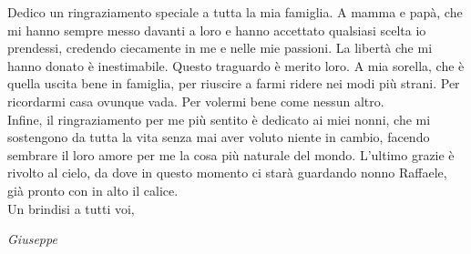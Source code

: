 Dedico un ringraziamento speciale a tutta la mia famiglia. A mamma e papà, che mi hanno sempre messo davanti a loro e hanno accettato qualsiasi scelta io prendessi, credendo ciecamente in me e nelle mie passioni. La libertà che mi hanno donato è inestimabile. Questo traguardo è merito loro. A mia sorella, che è quella uscita bene in famiglia, per riuscire a farmi ridere nei modi più strani. Per ricordarmi casa ovunque vada. Per volermi bene come nessun altro.\\
Infine, il ringraziamento per me più sentito è dedicato ai miei nonni, che mi sostengono da tutta la vita senza mai aver voluto niente in cambio, facendo sembrare il loro amore per me la cosa più naturale del mondo. L’ultimo grazie è rivolto al cielo, da dove in questo momento ci starà guardando nonno Raffaele, già pronto con in alto il calice.\\

Un brindisi a tutti voi,
\begin{flushright}
    \textit{Giuseppe}
\end{flushright}